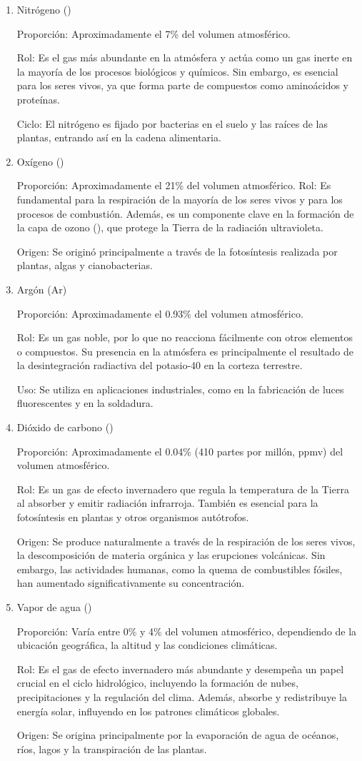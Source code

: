 \begin{enumerate}
\item  Nitrógeno ()

Proporción: Aproximadamente el 7\% del volumen atmosférico.

Rol: Es el gas más abundante en la atmósfera y actúa como un gas inerte en la mayoría de los procesos biológicos y químicos. Sin embargo, es esencial para los seres vivos, ya que forma parte de compuestos como aminoácidos y proteínas.

Ciclo: El nitrógeno es fijado por bacterias en el suelo y las raíces de las plantas, entrando así en la cadena alimentaria.
\item Oxígeno ()

Proporción: Aproximadamente el 21\% del volumen atmosférico.
Rol: Es fundamental para la respiración de la mayoría de los seres vivos y para los procesos de combustión. Además, es un componente clave en la formación de la capa de ozono (), que protege la Tierra de la radiación ultravioleta.

Origen: Se originó principalmente a través de la fotosíntesis realizada por plantas, algas y cianobacterias.
\item Argón (Ar)

Proporción: Aproximadamente el 0.93\% del volumen atmosférico.

Rol: Es un gas noble, por lo que no reacciona fácilmente con otros elementos o compuestos. Su presencia en la atmósfera es principalmente el resultado de la desintegración radiactiva del potasio-40 en la corteza terrestre.

Uso: Se utiliza en aplicaciones industriales, como en la fabricación de luces fluorescentes y en la soldadura.
\item Dióxido de carbono ()

Proporción: Aproximadamente el 0.04\% (410 partes por millón, ppmv) del volumen atmosférico.

Rol: Es un gas de efecto invernadero que regula la temperatura de la Tierra al absorber y emitir radiación infrarroja. También es esencial para la fotosíntesis en plantas y otros organismos autótrofos.

Origen: Se produce naturalmente a través de la respiración de los seres vivos, la descomposición de materia orgánica y las erupciones volcánicas. Sin embargo, las actividades humanas, como la quema de combustibles fósiles, han aumentado significativamente su concentración.
\item Vapor de agua ()

Proporción: Varía entre 0\% y 4\% del volumen atmosférico, dependiendo de la ubicación geográfica, la altitud y las condiciones climáticas.

Rol: Es el gas de efecto invernadero más abundante y desempeña un papel crucial en el ciclo hidrológico, incluyendo la formación de nubes, precipitaciones y la regulación del clima. Además, absorbe y redistribuye la energía solar, influyendo en los patrones climáticos globales.

Origen: Se origina principalmente por la evaporación de agua de océanos, ríos, lagos y la transpiración de las plantas.
\end{enumerate}

